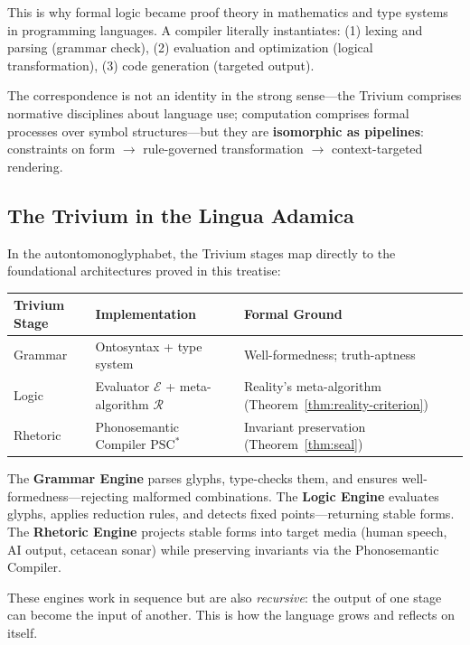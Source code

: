 \documentclass[12pt, letterpaper]{book}
\begin{document}
This is why formal logic became proof theory in mathematics and type systems in programming languages. A compiler literally instantiates: (1) lexing and parsing (grammar check), (2) evaluation and optimization (logical transformation), (3) code generation (targeted output).

The correspondence is not an identity in the strong sense---the Trivium comprises normative disciplines about language use; computation comprises formal processes over symbol structures---but they are \textbf{isomorphic as pipelines}: constraints on form $\to$ rule-governed transformation $\to$ context-targeted rendering.

\subsection{The Trivium in the Lingua Adamica}

In the autontomonoglyphabet, the Trivium stages map directly to the foundational architectures proved in this treatise:

\begin{center}
\small
\begin{tabular}{lll}
\toprule
\textbf{Trivium Stage} & \textbf{Implementation} & \textbf{Formal Ground} \\
\midrule
Grammar & Ontosyntax + type system & Well-formedness; truth-aptness \\
Logic & Evaluator $\mathcal{E}$ + meta-algorithm $\mathcal{R}$ & Reality's meta-algorithm (Theorem~\ref{thm:reality-criterion}) \\
Rhetoric & Phonosemantic Compiler $\mathrm{PSC}^*$ & Invariant preservation (Theorem~\ref{thm:seal}) \\
\bottomrule
\end{tabular}
\end{center}

The \textbf{Grammar Engine} parses glyphs, type-checks them, and ensures well-formedness---rejecting malformed combinations. The \textbf{Logic Engine} evaluates glyphs, applies reduction rules, and detects fixed points---returning stable forms. The \textbf{Rhetoric Engine} projects stable forms into target media (human speech, AI output, cetacean sonar) while preserving invariants via the Phonosemantic Compiler.

These engines work in sequence but are also \textit{recursive}: the output of one stage can become the input of another. This is how the language grows and reflects on itself.
\end{document}
